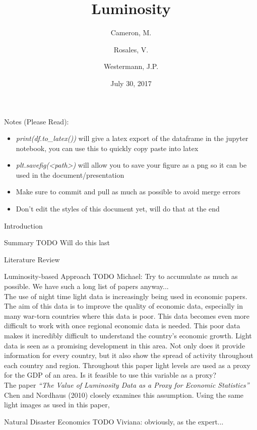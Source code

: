 \documentclass[12pt,fleqn,leqno,letterpaper]{article}
\title{Luminosity}
\author{
  Cameron, M.
  \and
  Rosales, V.
  \and
  Westermann, J.P.
}
\date{July 30, 2017}
\begin{document}
\maketitle

\newpage
\tableofcontents
\listoffigures
\listoftables

\newpage

Notes (Please Read):
\begin{itemize}
  \item \textit{print(df.to\_latex())} will give a latex export of the dataframe in the jupyter notebook, you can use this to quickly copy paste into latex
  \item \textit{plt.savefig(<path>)} will allow you to save your figure as a png so it can be used in the document/presentation
  \item Make sure to commit and pull as much as possible to avoid merge errors
  \item Don't edit the styles of this document yet, will do that at the end
\end{itemize}

\begin{section}{Introduction}
  \begin{subsection}{Summary}
    TODO Will do this last
  \end{subsection}
  \begin{subsection}{Literature Review}
    \begin{subsubsection}{Luminosity-based Approach}
      TODO Michael: Try to accumulate as much as possible. We have such a long list of papers anyway...\\
      The use of night time light data is increasingly being used in economic papers. The aim of this data is to improve the quality of economic data, especially in many war-torn countries where this data is poor. This data becomes even more difficult to work with once regional economic data is needed. This poor data makes it incredibly difficult to understand the country's economic growth. Light data is seen as a promising development in this area. Not only does it provide information for every country, but it also show the spread of activity throughout each country and region. Throughout this paper light levels are used as a proxy for the GDP of an area. Is it feasible to use this variable as a proxy? \\
      
      The paper \textit{``The Value of Luminosity Data as a Proxy for Economic Statistics''} Chen and Nordhaus (2010) closely examines this assumption. Using the same light images as used in this paper,  
 		
      
    \end{subsubsection}
    \begin{subsubsection}{Natural Disaster Economics}
      TODO Viviana: obviously, as the expert...
    \end{subsubsection}
  \end{subsection}
\end{section}
\end{document}
